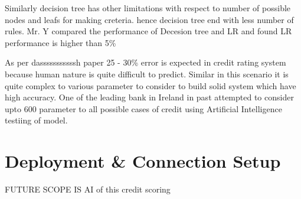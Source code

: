 Similarly decision tree has other limitations with respect to number of possible nodes and leafs for making creteria. hence decision tree end with less number of rules. Mr. Y compared the performance of Decesion tree and LR and found LR performance is higher than 5\%

As per dasssssssssssh paper 25 - 30\% error is expected in credit rating system because human nature is quite difficult to predict. Similar in this scenario it is quite complex to various parameter to consider to build solid system which have high accuracy. One of the leading bank in Ireland in past attempted to consider upto 600 parameter to all possible cases of credit using Artificial Intelligence 
testiing of model.




\section{Deployment \& Connection Setup}


FUTURE SCOPE IS AI of this credit scoring
